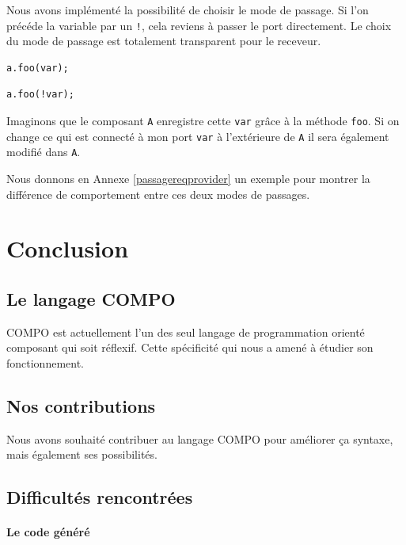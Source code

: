 \documentclass[11pt,a4paper,openany,oneside]{book}
\begin{document}
Nous avons implémenté la possibilité de choisir le mode de passage. Si l'on précéde la variable par un \texttt{!}, cela reviens à passer le port directement. Le choix du mode de passage est totalement transparent pour le receveur.

\begin{lstlisting}[language=COMPO, frame=single, caption=Syntaxe du passage par founis en COMPO]
a.foo(var);
\end{lstlisting}

\begin{lstlisting}[language=COMPO, frame=single, caption=Syntaxe du passage par requis en COMPO]
a.foo(!var);
\end{lstlisting}

Imaginons que le composant \texttt{A} enregistre cette \texttt{var} grâce à la méthode \texttt{foo}. Si on change ce qui est connecté à mon port \texttt{var} à l'extérieure de \texttt{A} il sera également modifié dans \texttt{A}.

Nous donnons en Annexe \ref{passagereqprovider} un exemple pour montrer la différence de comportement entre ces deux modes de passages.

\chapter{Conclusion}

\section{Le langage COMPO}

COMPO est actuellement l'un des seul langage de programmation orienté composant qui soit réflexif. Cette spécificité qui nous a amené à étudier son fonctionnement.


\section{Nos contributions}

Nous avons souhaité contribuer au langage COMPO pour améliorer ça syntaxe, mais également ses possibilités.

\section{Difficultés rencontrées}

\subsubsection{Le code généré}
\end{document}
